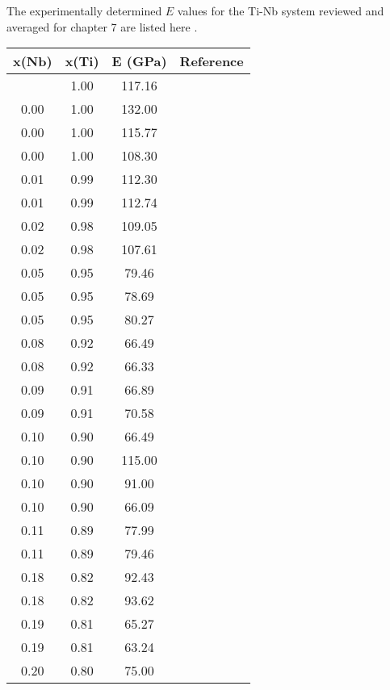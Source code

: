 The experimentally determined $E$ values for the Ti-Nb system reviewed and averaged for chapter 7 are listed here \cite{Timoshevskii2011,Friak2012,Karre2015,Ozaki2004}.
\noindent 
\begin{longtable}[H]{ c c c c }
	\hline
	x(Nb) & x(Ti) & E (GPa) & Reference \\
	\hline
	\endhead
	\hline
	\endfoot
	 0.00 & 1.00 & 117.16 & \cite{Timoshevskii2011}\\
	 0.00 & 1.00 & 132.00 & \cite{Friak2012}\\
	 0.00 & 1.00 & 115.77 & \cite{Ozaki2004}\\
	 0.00 & 1.00 & 108.30 & \cite{Karre2015}\\
	 0.01 & 0.99 & 112.30 & \cite{Timoshevskii2011}\\
	 0.01 & 0.99 & 112.74 & \cite{Ozaki2004}\\
	 0.02 & 0.98 & 109.05 & \cite{Timoshevskii2011}\\
	 0.02 & 0.98 & 107.61 & \cite{Ozaki2004}\\
	 0.05 & 0.95 & 79.46 & \cite{Timoshevskii2011}\\
	 0.05 & 0.95 & 78.69 & \cite{Ozaki2004}\\
	 0.05 & 0.95 & 80.27 & \cite{Timoshevskii2011}\\
	 0.08 & 0.92 & 66.49 & \cite{Timoshevskii2011}\\
	 0.08 & 0.92 & 66.33 & \cite{Ozaki2004}\\
	 0.09 & 0.91 & 66.89 & \cite{Timoshevskii2011}\\
	 0.09 & 0.91 & 70.58 & \cite{Karre2015}\\
	 0.10 & 0.90 & 66.49 & \cite{Timoshevskii2011}\\
	 0.10 & 0.90 & 115.00 & \cite{Friak2012}\\
	 0.10 & 0.90 & 91.00 & \cite{Friak2012}\\
	 0.10 & 0.90 & 66.09 & \cite{Ozaki2004}\\
	 0.11 & 0.89 & 77.99 & \cite{Ozaki2004}\\
	 0.11 & 0.89 & 79.46 & \cite{Timoshevskii2011}\\
	 0.18 & 0.82 & 92.43 & \cite{Timoshevskii2011}\\
	 0.18 & 0.82 & 93.62 & \cite{Ozaki2004}\\
	 0.19 & 0.81 & 65.27 & \cite{Timoshevskii2011}\\
	 0.19 & 0.81 & 63.24 & \cite{Timoshevskii2011}\\
	 0.20 & 0.80 & 75.00 & \cite{Friak2012}\\

\end{longtable}
